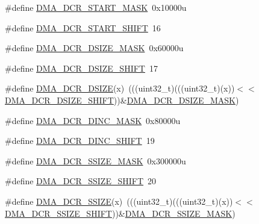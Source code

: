 \begin{DoxyCompactItemize}
\item 
\#define \hyperlink{group___d_m_a___register___masks_gaaaca42eb6474221a4e91f687194fafd6}{D\+M\+A\+\_\+\+D\+C\+R\+\_\+\+S\+T\+A\+R\+T\+\_\+\+M\+A\+SK}~0x10000u
\item 
\#define \hyperlink{group___d_m_a___register___masks_ga86b820fe50e65e5c67d14ba4d3d36c6c}{D\+M\+A\+\_\+\+D\+C\+R\+\_\+\+S\+T\+A\+R\+T\+\_\+\+S\+H\+I\+FT}~16
\item 
\#define \hyperlink{group___d_m_a___register___masks_ga2b7bfbe2aea8f1b41a42795ff78c4fd5}{D\+M\+A\+\_\+\+D\+C\+R\+\_\+\+D\+S\+I\+Z\+E\+\_\+\+M\+A\+SK}~0x60000u
\item 
\#define \hyperlink{group___d_m_a___register___masks_ga6b04b13ff50c5d9247f9a12dd582d511}{D\+M\+A\+\_\+\+D\+C\+R\+\_\+\+D\+S\+I\+Z\+E\+\_\+\+S\+H\+I\+FT}~17
\item 
\#define \hyperlink{group___d_m_a___register___masks_gaf044df6bf3889f7166fafff5ceab4f67}{D\+M\+A\+\_\+\+D\+C\+R\+\_\+\+D\+S\+I\+ZE}(x)~(((uint32\+\_\+t)(((uint32\+\_\+t)(x))$<$$<$\hyperlink{group___d_m_a___register___masks_ga6b04b13ff50c5d9247f9a12dd582d511}{D\+M\+A\+\_\+\+D\+C\+R\+\_\+\+D\+S\+I\+Z\+E\+\_\+\+S\+H\+I\+FT}))\&\hyperlink{group___d_m_a___register___masks_ga2b7bfbe2aea8f1b41a42795ff78c4fd5}{D\+M\+A\+\_\+\+D\+C\+R\+\_\+\+D\+S\+I\+Z\+E\+\_\+\+M\+A\+SK})
\item 
\#define \hyperlink{group___d_m_a___register___masks_gad93bc8cb86ddeb7a40d9cd80011f8ee7}{D\+M\+A\+\_\+\+D\+C\+R\+\_\+\+D\+I\+N\+C\+\_\+\+M\+A\+SK}~0x80000u
\item 
\#define \hyperlink{group___d_m_a___register___masks_ga9a4a7d49cd76a2821e2cf192d3a49fcd}{D\+M\+A\+\_\+\+D\+C\+R\+\_\+\+D\+I\+N\+C\+\_\+\+S\+H\+I\+FT}~19
\item 
\#define \hyperlink{group___d_m_a___register___masks_ga5be9c16cc5eddfdd04e7820f698cd401}{D\+M\+A\+\_\+\+D\+C\+R\+\_\+\+S\+S\+I\+Z\+E\+\_\+\+M\+A\+SK}~0x300000u
\item 
\#define \hyperlink{group___d_m_a___register___masks_ga4229a9ea2db9960308edf51034836083}{D\+M\+A\+\_\+\+D\+C\+R\+\_\+\+S\+S\+I\+Z\+E\+\_\+\+S\+H\+I\+FT}~20
\item 
\#define \hyperlink{group___d_m_a___register___masks_gac99e697c8ad0a82435cbf3ccce099886}{D\+M\+A\+\_\+\+D\+C\+R\+\_\+\+S\+S\+I\+ZE}(x)~(((uint32\+\_\+t)(((uint32\+\_\+t)(x))$<$$<$\hyperlink{group___d_m_a___register___masks_ga4229a9ea2db9960308edf51034836083}{D\+M\+A\+\_\+\+D\+C\+R\+\_\+\+S\+S\+I\+Z\+E\+\_\+\+S\+H\+I\+FT}))\&\hyperlink{group___d_m_a___register___masks_ga5be9c16cc5eddfdd04e7820f698cd401}{D\+M\+A\+\_\+\+D\+C\+R\+\_\+\+S\+S\+I\+Z\+E\+\_\+\+M\+A\+SK})

\end{DoxyCompactItemize}
